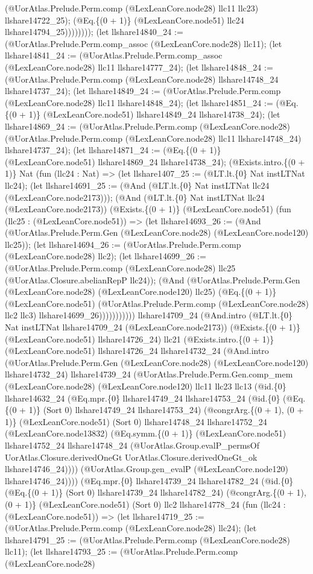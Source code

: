 \documentclass[11pt]{article}
\begin{document}
(@UorAtlas.Prelude.Perm.comp (@LexLeanCore.node28) llc11 llc23) llshare14722\_25); (@Eq.\{(0 + 1)\} (@LexLeanCore.node51) llc24 llshare14794\_25)))))))); (let llshare14840\_24 := (@UorAtlas.Prelude.Perm.comp\_assoc (@LexLeanCore.node28) llc11); (let llshare14841\_24 := (@UorAtlas.Prelude.Perm.comp\_assoc (@LexLeanCore.node28) llc11 llshare14777\_24); (let llshare14848\_24 := (@UorAtlas.Prelude.Perm.comp (@LexLeanCore.node28) llshare14748\_24 llshare14737\_24); (let llshare14849\_24 := (@UorAtlas.Prelude.Perm.comp (@LexLeanCore.node28) llc11 llshare14848\_24); (let llshare14851\_24 := (@Eq.\{(0 + 1)\} (@LexLeanCore.node51) llshare14849\_24 llshare14738\_24); (let llshare14869\_24 := (@UorAtlas.Prelude.Perm.comp (@LexLeanCore.node28) (@UorAtlas.Prelude.Perm.comp (@LexLeanCore.node28) llc11 llshare14748\_24) llshare14737\_24); (let llshare14871\_24 := (@Eq.\{(0 + 1)\} (@LexLeanCore.node51) llshare14869\_24 llshare14738\_24); (@Exists.intro.\{(0 + 1)\} Nat (fun (llc24 : Nat) => (let llshare1407\_25 := (@LT.lt.\{0\} Nat instLTNat llc24); (let llshare14691\_25 := (@And (@LT.lt.\{0\} Nat instLTNat llc24 (@LexLeanCore.node2173))); (@And (@LT.lt.\{0\} Nat instLTNat llc24 (@LexLeanCore.node2173)) (@Exists.\{(0 + 1)\} (@LexLeanCore.node51) (fun (llc25 : (@LexLeanCore.node51)) => (let llshare14693\_26 := (@And (@UorAtlas.Prelude.Perm.Gen (@LexLeanCore.node28) (@LexLeanCore.node120) llc25)); (let llshare14694\_26 := (@UorAtlas.Prelude.Perm.comp (@LexLeanCore.node28) llc2); (let llshare14699\_26 := (@UorAtlas.Prelude.Perm.comp (@LexLeanCore.node28) llc25 (@UorAtlas.Closure.abelianRepP llc24)); (@And (@UorAtlas.Prelude.Perm.Gen (@LexLeanCore.node28) (@LexLeanCore.node120) llc25) (@Eq.\{(0 + 1)\} (@LexLeanCore.node51) (@UorAtlas.Prelude.Perm.comp (@LexLeanCore.node28) llc2 llc3) llshare14699\_26))))))))))) llshare14709\_24 (@And.intro (@LT.lt.\{0\} Nat instLTNat llshare14709\_24 (@LexLeanCore.node2173)) (@Exists.\{(0 + 1)\} (@LexLeanCore.node51) llshare14726\_24) llc21 (@Exists.intro.\{(0 + 1)\} (@LexLeanCore.node51) llshare14726\_24 llshare14732\_24 (@And.intro (@UorAtlas.Prelude.Perm.Gen (@LexLeanCore.node28) (@LexLeanCore.node120) llshare14732\_24) llshare14739\_24 (@UorAtlas.Prelude.Perm.Gen.comp\_mem (@LexLeanCore.node28) (@LexLeanCore.node120) llc11 llc23 llc13 (@id.\{0\} llshare14632\_24 (@Eq.mpr.\{0\} llshare14749\_24 llshare14753\_24 (@id.\{0\} (@Eq.\{(0 + 1)\} (Sort 0) llshare14749\_24 llshare14753\_24) (@congrArg.\{(0 + 1), (0 + 1)\} (@LexLeanCore.node51) (Sort 0) llshare14748\_24 llshare14752\_24 (@LexLeanCore.node13832) (@Eq.symm.\{(0 + 1)\} (@LexLeanCore.node51) llshare14752\_24 llshare14748\_24 (@UorAtlas.Group.evalP\_permsOf UorAtlas.Closure.derivedOneGt UorAtlas.Closure.derivedOneGt\_ok llshare14746\_24)))) (@UorAtlas.Group.gen\_evalP (@LexLeanCore.node120) llshare14746\_24)))) (@Eq.mpr.\{0\} llshare14739\_24 llshare14782\_24 (@id.\{0\} (@Eq.\{(0 + 1)\} (Sort 0) llshare14739\_24 llshare14782\_24) (@congrArg.\{(0 + 1), (0 + 1)\} (@LexLeanCore.node51) (Sort 0) llc2 llshare14778\_24 (fun (llc24 : (@LexLeanCore.node51)) => (let llshare14719\_25 := (@UorAtlas.Prelude.Perm.comp (@LexLeanCore.node28) llc24); (let llshare14791\_25 := (@UorAtlas.Prelude.Perm.comp (@LexLeanCore.node28) llc11); (let llshare14793\_25 := (@UorAtlas.Prelude.Perm.comp (@LexLeanCore.node28) 
\end{document}
